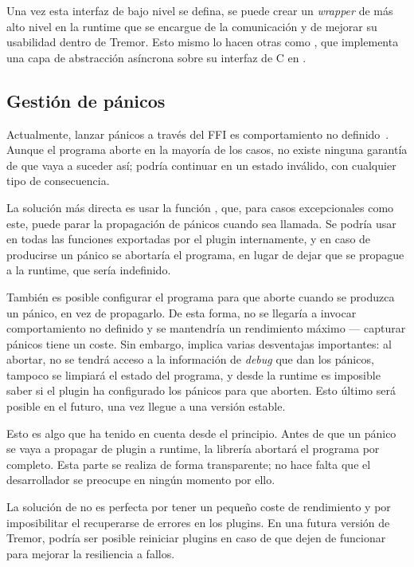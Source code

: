 Una vez esta interfaz de bajo nivel se defina, se puede crear un \emph{wrapper}
de más alto nivel en la runtime que se encargue de la comunicación y de mejorar
su usabilidad dentro de Tremor. Esto mismo lo hacen otras \crates como
, que implementa una capa de abstracción asíncrona sobre su
interfaz de C en .

\subsection{Gestión de pánicos}

Actualmente, lanzar pánicos a través del FFI es comportamiento no
definido~\cite[FFI and Panics]{nomicon}. Aunque el programa aborte en la mayoría
de los casos, no existe ninguna garantía de que vaya a suceder así; podría
continuar en un estado inválido, con cualquier tipo de consecuencia.

La solución más directa es usar la función , que,
para casos excepcionales como este, puede parar la propagación de pánicos cuando
sea llamada. Se podría usar en todas las funciones exportadas por el plugin
internamente, y en caso de producirse un pánico se abortaría el programa, en
lugar de dejar que se propague a la runtime, que sería indefinido.

También es posible configurar el programa para que aborte cuando se produzca un
pánico, en vez de propagarlo. De esta forma, no se llegaría a invocar
comportamiento no definido y se mantendría un rendimiento máximo --- capturar
pánicos tiene un coste. Sin embargo, implica varias desventajas importantes: al
abortar, no se tendrá acceso a la información de \emph{debug} que dan los
pánicos, tampoco se limpiará el estado del programa, y desde la runtime es
imposible saber si el plugin ha configurado los pánicos para que aborten. Esto
último será posible en el futuro, una vez \textcite{pluggablepanic} llegue a una
versión estable.

Esto es algo que \abistable ha tenido en cuenta desde el principio. Antes de que
un pánico se vaya a propagar de plugin a runtime, la librería abortará el
programa por completo. Esta parte se realiza de forma transparente; no hace
falta que el desarrollador se preocupe en ningún momento por ello.

La solución de \abistable no es perfecta por tener un pequeño coste de
rendimiento y por imposibilitar el recuperarse de errores en los plugins. En una
futura versión de Tremor, podría ser posible reiniciar plugins en caso de que
dejen de funcionar para mejorar la resiliencia a fallos.

